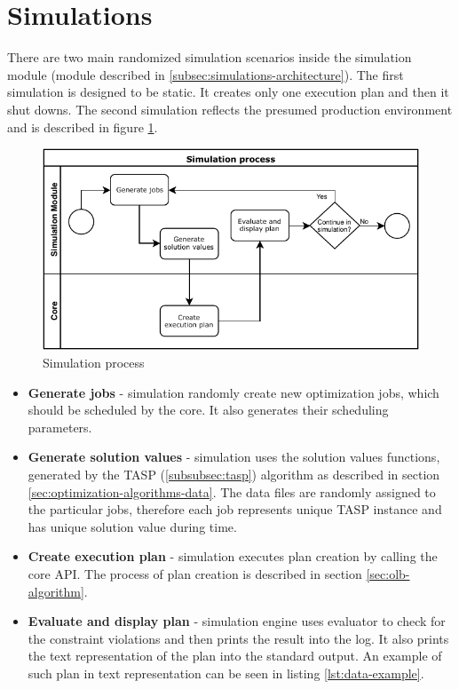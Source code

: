 \section{Simulations}\label{sec:simulations}

There are two main randomized simulation scenarios inside the simulation module 
(module described in \ref{subsec:simulations-architecture}).
The first simulation is designed to be static.
It creates only one execution plan
and then it shut downs.
The second simulation reflects the presumed production environment
and is described in figure \ref{fig:simulation-process}.

\begin{figure}[ht] 
	\includegraphics[width=\textwidth]{i_simulation_process.pdf} 
	\centering
	\caption{Simulation process}
	\label{fig:simulation-process}
\end{figure}

\begin{itemize}
	\item \textbf{Generate jobs} - simulation randomly create new optimization jobs, 
	      which should be scheduled by the core.
	      It also generates their scheduling parameters.
	\item \textbf{Generate solution values} - simulation uses the solution values functions,
	      generated by the TASP (\ref{subsubsec:tasp}) algorithm as described in section \ref{sec:optimization-algorithms-data}.
	      The data files are randomly assigned to the particular jobs, 
	      therefore each job represents unique TASP instance
	      and has unique solution value during time.
	\item \textbf{Create execution plan} - simulation executes plan creation by calling the core API.
	      The process of plan creation is described in section \ref{sec:olb-algorithm}.
	\item \textbf{Evaluate and display plan} - simulation engine uses evaluator to check for the constraint violations
	      and then prints the result into the log.
	      It also prints the text representation of the plan into the standard output. 
	      An example of such plan in text representation can be seen in listing \ref{lst:data-example}.
\end{itemize}


